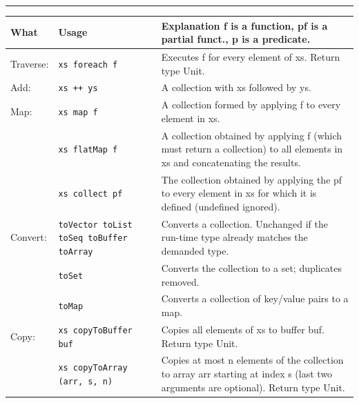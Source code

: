 \documentclass[article, a5paper]{memoir}
\newcommand{\LangColor}{red}
\newcommand{\head}[1]{{\bfseries {\color{\LangColor}{#1}}\par\vspace{1mm}\hrule\vspace{-2mm}}}
\renewcommand{\arraystretch}{0.9}
\newcommand{\Newline}{\vspace{\baselineskip}}
\begin{document}

\clearpage

\head{Methods in trait \texttt{Traversable[A]}}\Newline

{\small\renewcommand{\arraystretch}{1.2}
\begin{tabular}{@{}l p{3.5cm} p{6.8cm}}
\textbf{What} & \textbf{Usage} & \textbf{Explanation} f is a function, pf is a partial funct., p is a predicate.\\ \hline
Traverse: & \texttt{xs foreach f} & Executes f for every element of xs. Return type Unit.\\ \cline{1-3}

  Add: & \texttt{xs ++ ys} & A collection with xs followed by ys.\\\cline{1-3}
  
  Map: & \texttt{xs map f} & A collection formed by applying f to every element in xs.\\ \cline{2-3}
       & \texttt{xs flatMap f} & A collection obtained by applying f (which must return a collection) to all elements in xs and concatenating the results.\\ \cline{2-3}
       & \texttt{xs collect pf} & The collection obtained by applying the pf to every element in xs for which it is defined (undefined ignored).\\ \cline{1-3}

  Convert: & \texttt{toVector toList toSeq toBuffer toArray} & Converts a collection. Unchanged if the run-time type already matches the demanded type.\\ \cline{2-3}
   & \texttt{toSet} & Converts the collection to a set; duplicates removed.\\ \cline{2-3}
   & \texttt{toMap} & Converts a collection of key/value pairs to a map. \\ \cline{1-3}

  Copy: & \texttt{xs copyToBuffer buf } & Copies all elements of xs to buffer buf. Return type Unit.\\ \cline{2-3}
   & \texttt{xs copyToArray (arr, s, n)} & Copies at most n elements of the collection to array arr starting at index s (last two arguments are optional). Return type Unit.\\ \cline{1-3}


\end{tabular}}
\end{document}
